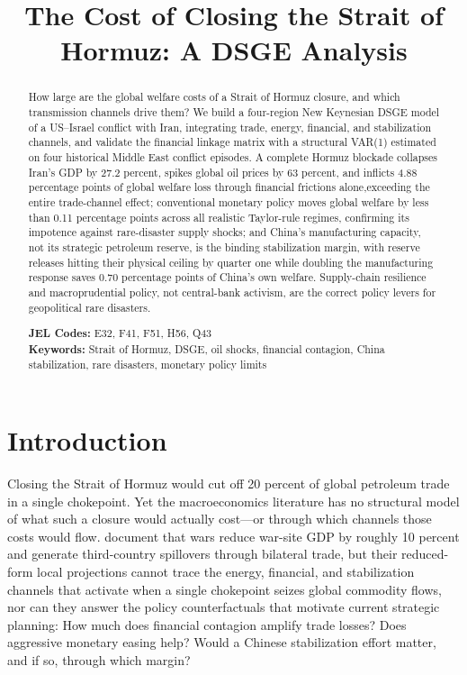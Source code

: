\documentclass[12pt]{article}
\title{\textbf{The Cost of Closing the Strait of Hormuz: A DSGE Analysis}}
\author{}
\date{}
\begin{document}
\maketitle

\begin{abstract}
\noindent
How large are the global welfare costs of a Strait of Hormuz closure, and which transmission channels drive them? We build a four-region New Keynesian DSGE model of a US--Israel conflict with Iran, integrating trade, energy, financial, and stabilization channels, and validate the financial linkage matrix with a structural VAR(1) estimated on four historical Middle East conflict episodes. A complete Hormuz blockade collapses Iran's GDP by 27.2 percent, spikes global oil prices by 63 percent, and inflicts 4.88 percentage points of global welfare loss through financial frictions alone,exceeding the entire trade-channel effect; conventional monetary policy moves global welfare by less than 0.11 percentage points across all realistic Taylor-rule regimes, confirming its impotence against rare-disaster supply shocks; and China's manufacturing capacity, not its strategic petroleum reserve, is the binding stabilization margin, with reserve releases hitting their physical ceiling by quarter one while doubling the manufacturing response saves 0.70 percentage points of China's own welfare. Supply-chain resilience and macroprudential policy, not central-bank activism, are the correct policy levers for geopolitical rare disasters.

\bigskip
\noindent \textbf{JEL Codes:} E32, F41, F51, H56, Q43 \\
\noindent \textbf{Keywords:} Strait of Hormuz, DSGE, oil shocks, financial contagion, China stabilization, rare disasters, monetary policy limits
\end{abstract}

\thispagestyle{empty}
\newpage
\setcounter{page}{1}



\section{Introduction}

	Closing the Strait of Hormuz would cut off 20 percent of global petroleum trade in a single chokepoint. Yet the macroeconomics literature has no structural model of what such a closure would actually cost---or through which channels those costs would flow. \citet{federle2026price} document that wars reduce war-site GDP by roughly 10 percent and generate third-country spillovers through bilateral trade, but their reduced-form local projections cannot trace the energy, financial, and stabilization channels that activate when a single chokepoint seizes global commodity flows, nor can they answer the policy counterfactuals that motivate current strategic planning: How much does financial contagion amplify trade losses? Does aggressive monetary easing help? Would a Chinese stabilization effort matter, and if so, through which margin?
\end{document}
